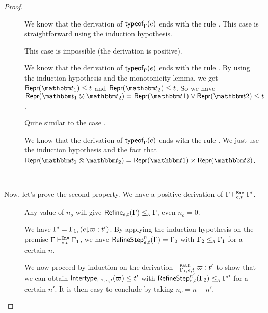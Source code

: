 \documentclass[a4paper]{article}
\theoremstyle{definition}
\begin{document}
\begin{proof}
\begin{description}
    \item[] We know that the derivation of $\textsf{typeof}_{\Gamma}(e)$ ends with the rule .
    This case is straightforward using the induction hypothesis.
    \item[] This case is impossible (the derivation is positive).
    \item[] We know that the derivation of $\textsf{typeof}_{\Gamma}(e)$ ends with the rule .
    By using the induction hypothesis and the monotonicity lemma, we get $\tsrep{\ts_1}\leq t$ and $\tsrep{\ts_2}\leq t$.
    So we have $\tsrep{\ts_1\tsor\ts_2}=\tsrep{\ts1}\vee\tsrep{\ts2}\leq t$.
    \item[] Quite similar to the case .
    \item[] We know that the derivation of $\textsf{typeof}_{\Gamma}(e)$ ends with the rule .
    We just use the induction hypothesis and the fact that $\tsrep{\ts_1\tstimes\ts_2}=\pair {\tsrep{\ts1}} {\tsrep{\ts2}}$.
  \end{description}

  \ 

  Now, let's prove the second property. We have a positive derivation of $\Gamma \vdash^{\texttt{Env}}_{e,t} \Gamma'$.

  \begin{description}
    \item[] Any value of $n_o$ will give $\textsf{Refine}_{e,t}(\Gamma) \leq_{\!\scriptscriptstyle\mathcal{A}} \Gamma$, even $n_o = 0$.
    \item[] We have $\Gamma' = \Gamma_1,(e{\downarrow}\varpi:t')$.
    By applying the induction hypothesis on the premise $\Gamma \vdash^{\texttt{Env}}_{e,t} \Gamma_1$, we have
    $\textsf{RefineStep}_{e,t}^n (\Gamma) = \Gamma_2$ with $\Gamma_2 \leq_{\!\scriptscriptstyle\mathcal{A}} \Gamma_1$ for a certain $n$.

    We now proceed by induction on the derivation $\vdash^{\texttt{Path}}_{\Gamma_1,e,t} \varpi:t'$
    to show that we can obtain $\textsf{Intertype}_{\Gamma'',e,t} (\varpi) \leq t'$ with $\textsf{RefineStep}_{e,t}^{n'} (\Gamma_2) \leq_{\!\scriptscriptstyle\mathcal{A}} \Gamma''$
    for a certain $n'$. It is then easy to conclude by taking $n_o = n+n'$.


\end{description}
\end{proof}
\end{document}
